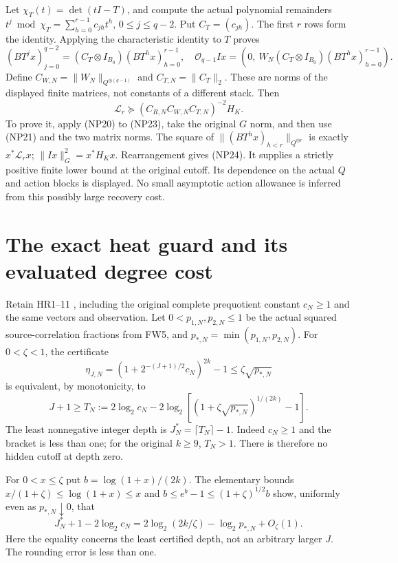 \documentclass[11pt]{article}
\begin{document}
Let $\chi_T(t)=\det(tI-T)$, and compute the actual polynomial
remainders
$t^j\bmod\chi_T=\sum_{h=0}^{r-1}c_{jh}t^h$, $0\le j\le q-2$.
Put $C_T=(c_{jh})$. The first $r$ rows form the identity. Applying
the characteristic identity to $T$ proves
\[
 (BT^jx)_{j=0}^{q-2}=(C_T\otimes I_{B_0})(BT^hx)_{h=0}^{r-1},
 \quad
 \mathcal O_{q-1}Ix=
 (0,\ W_N(C_T\otimes I_{B_0})(BT^hx)_{h=0}^{r-1}).
 \tag{NP23}
\]
Define $C_{W,N}=\|W_N\|_{Q^{\oplus(q-1)}}$ and
$C_{T,N}=\|C_T\|_2$. These are norms of the displayed finite
matrices, not constants of a different stack. Then
\[
 \boxed{\quad
 \mathcal L_r\succeq
    (C_{R,N}C_{W,N}C_{T,N})^{-2}H_K.
 \quad} \tag{NP24}
\]
To prove it, apply (NP20) to (NP23), take the original $G$ norm,
and then use (NP21) and the two matrix norms. The square of
$\|(BT^hx)_{h<r}\|_{Q^{\oplus r}}$ is exactly
$x^*\mathcal L_rx$; $\|Ix\|_G^2=x^*H_Kx$. Rearrangement gives
(NP24). It supplies a strictly positive finite lower bound at the
original cutoff. Its dependence on the actual $Q$ and action blocks
is displayed. No small asymptotic action allowance is inferred from
this possibly large recovery cost.

\section{The exact heat guard and its evaluated degree cost}
Retain HR1--11 \cite{heat}, including the original complete
prequotient constant $c_N\ge1$ and the same vectors and observation.
Let $0<p_{1,N},p_{2,N}\le1$ be the actual squared source-correlation
fractions from FW5, and $p_{*,N}=\min(p_{1,N},p_{2,N})$.
For $0<\zeta<1$, the certificate
\[
 \eta_{J,N}=(1+2^{-(J+1)/2}c_N)^{2k}-1
       \le\zeta\sqrt{p_{*,N}}
 \tag{NP25}
\]
is equivalent, by monotonicity, to
\[
 J+1\ge T_N:=2\log_2c_N-2\log_2
 \left[(1+\zeta\sqrt{p_{*,N}})^{1/(2k)}-1\right].
 \tag{NP26}
\]
The least nonnegative integer depth is $J_N^*=\lceil T_N\rceil-1$.
Indeed $c_N\ge1$ and the bracket is less than one; for the original
$k\ge9$, $T_N>1$. There is therefore no hidden cutoff at depth zero.

For $0<x\le\zeta$ put $b=\log(1+x)/(2k)$. The elementary bounds
$x/(1+\zeta)\le\log(1+x)\le x$ and
$b\le e^b-1\le(1+\zeta)^{1/2}b$ show, uniformly even as
$p_{*,N}\downarrow0$, that
\[
 J_N^*+1-2\log_2c_N
 =2\log_2(2k/\zeta)-\log_2p_{*,N}+O_\zeta(1).
 \tag{NP27}
\]
Here the equality concerns the least certified depth, not an arbitrary
larger $J$. The rounding error is less than one.
\end{document}
